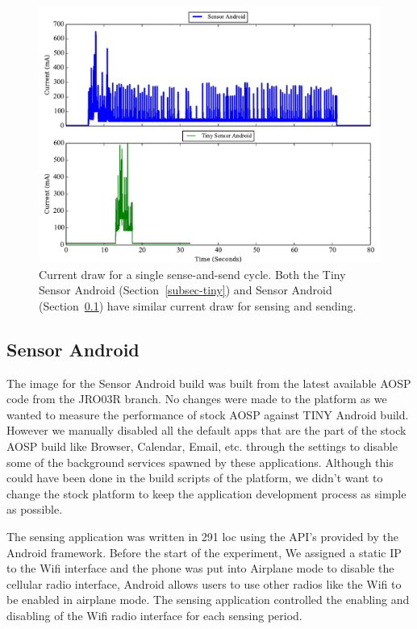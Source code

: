 \begin{figure}[t]
\includegraphics[width=\columnwidth]{./figures/traces.pdf}

\caption{\small Current draw for a single sense-and-send cycle.
\textnormal{Both the Tiny Sensor Android (Section~\ref{subsec-tiny}) and
            Sensor Android (Section~\ref{subsec-full}) have similar current draw for sensing and sending.}}

\label{fig-tinyandroid}
\end{figure}


\subsection{Sensor Android}
\label{subsec-full}

The image for the Sensor Android build was built from the latest available AOSP code 
from the JRO03R branch. No changes were made to the platform as we wanted to measure 
the performance of stock AOSP against TINY Android build.
However we manually disabled all the default apps that are the part of the stock AOSP build like Browser, 
Calendar, Email, etc. through the settings to disable some of the background services spawned by these applications. 
Although this could have been done in the build scripts of the platform, 
we didn't want to change the stock platform to keep the application development process as simple as possible.

The sensing application was written in 291 loc using the API's provided by the Android framework. 
Before the start of the experiment, We assigned a static IP to the Wifi interface and the phone was put into Airplane mode to 
disable the cellular radio interface, Android allows users to use other radios like the Wifi to be enabled in airplane mode.
The sensing application controlled the enabling and disabling of the Wifi radio interface for each sensing period.

